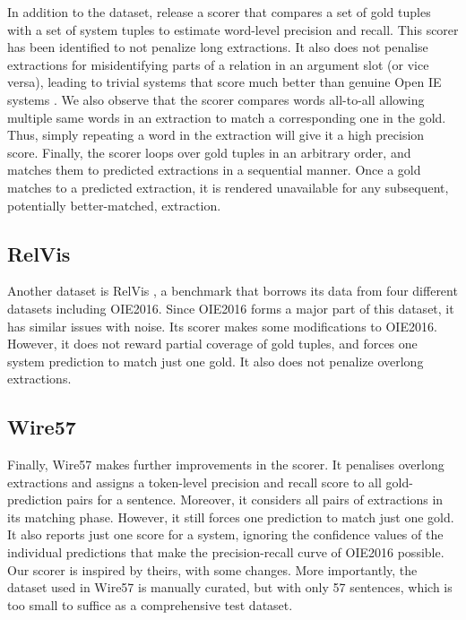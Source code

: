         In addition to the dataset, \citet{OIE2016} release a scorer that compares a set of gold tuples with a set of system tuples to estimate word-level precision and recall. This scorer has been identified to not penalize long extractions. It also does not penalise extractions for misidentifying parts of a relation in an argument slot (or vice versa), leading to trivial systems that score much better than genuine Open IE systems  \cite{Wire57}. We also observe that the scorer compares words all-to-all allowing multiple same words in an extraction to match a corresponding one in the gold. Thus, simply repeating a word in the extraction will give it a high precision score. Finally, the scorer loops over gold tuples in an arbitrary order, and matches them to predicted extractions in a sequential manner. Once a gold matches to a predicted extraction, it is rendered unavailable for any subsequent, potentially better-matched, extraction.

    \subsection{RelVis}
        Another dataset is RelVis \cite{Relvis}, a benchmark that borrows its data from four different datasets including OIE2016. Since OIE2016 forms a major part of this dataset, it has similar issues with noise. Its scorer makes some modifications to OIE2016. However, it does not reward partial coverage of gold tuples, and forces one system prediction to match just one gold. It also does not penalize overlong extractions.
        
    \subsection{Wire57}
        Finally, Wire57 \cite{Wire57} makes further improvements in the scorer. It  penalises overlong extractions and assigns a token-level precision and recall score to all gold-prediction pairs for a sentence. Moreover, it considers all pairs of extractions in its matching phase. However, it still forces one prediction to match just one gold. It also reports just one score for a system, ignoring the confidence values of the individual predictions that make the precision-recall curve of OIE2016 possible. Our scorer is inspired by theirs, with some changes. More importantly, the dataset used in Wire57 is manually curated, but with only 57 sentences, which is too small to suffice as a comprehensive test dataset.
        





